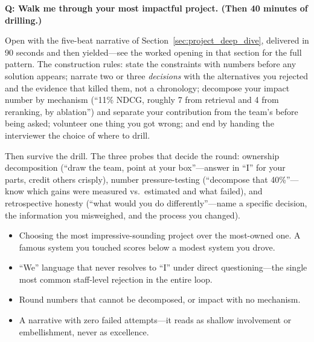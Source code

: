 \begin{interviewq}
\textbf{Q: Walk me through your most impactful project. (Then 40 minutes of drilling.)}

 \quad {} \quad \badgefreq{\freqhigh}

\stronganswer

Open with the five-beat narrative of Section~\ref{sec:project_deep_dive}, delivered in 90 seconds and then yielded---see the worked opening in that section for the full pattern. The construction rules: state the constraints with numbers before any solution appears; narrate two or three \textit{decisions} with the alternatives you rejected and the evidence that killed them, not a chronology; decompose your impact number by mechanism (``11\% NDCG, roughly 7 from retrieval and 4 from reranking, by ablation'') and separate your contribution from the team's before being asked; volunteer one thing you got wrong; and end by handing the interviewer the choice of where to drill.

Then survive the drill. The three probes that decide the round: ownership decomposition (``draw the team, point at your box''---answer in ``I'' for your parts, credit others crisply), number pressure-testing (``decompose that 40\%''---know which gains were measured vs.\ estimated and what failed), and retrospective honesty (``what would you do differently''---name a specific decision, the information you misweighed, and the process you changed).

\redflags
\begin{itemize}
    \item Choosing the most impressive-sounding project over the most-owned one. A famous system you touched scores below a modest system you drove.
    \item ``We'' language that never resolves to ``I'' under direct questioning---the single most common staff-level rejection in the entire loop.
    \item Round numbers that cannot be decomposed, or impact with no mechanism.
    \item A narrative with zero failed attempts---it reads as shallow involvement or embellishment, never as excellence.
\end{itemize}



\end{interviewq}
